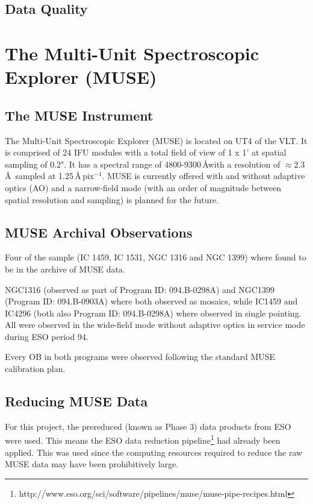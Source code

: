 	\subsection{Data Quality}
		\label{subsec:VIMOSartifacts}















\section{The Multi-Unit Spectroscopic Explorer (MUSE)}
	\label{sec:MUSE}
	\subsection{The MUSE Instrument}
		The Multi-Unit Spectroscopic Explorer (MUSE) is located on UT4 of the VLT. It is comprised of 24 IFU modules with a total field of view of 1 x 1' at spatial sampling of 0.2". It has a spectral range of 4800-9300\,\AA with a resolution of $\approx 2.3$\,\AA\ sampled at 1.25\,\AA\,pix$^{-1}$. MUSE is currently offered with and without adaptive optics (AO) and a narrow-field mode (with an order of magnitude between spatial resolution and sampling) is planned for the future. 
		
	\subsection{MUSE Archival Observations}
		Four of the sample (IC 1459, IC 1531, NGC 1316 and NGC 1399) where found to be in the archive of MUSE data.

		NGC1316 (observed as part of Program ID: 094.B-0298A) and NGC1399 (Program ID: 094.B-0903A) where both observed as mosaics, while IC1459 and IC4296 (both also Program ID: 094.B-0298A) where observed in single pointing. All were observed in the wide-field mode without adaptive optics in service mode during ESO period 94. 

		Every OB in both programs were observed following the standard MUSE calibration plan.

	\subsection{Reducing MUSE Data}
		For this project, the prereduced (known as Phase 3) data products from ESO were used. This means the ESO data reduction pipeline\footnote{http://www.eso.org/sci/software/pipelines/muse/muse-pipe-recipes.html} had already been applied. This was used since the computing resources required to reduce the raw MUSE data may have been prohibitively large.

